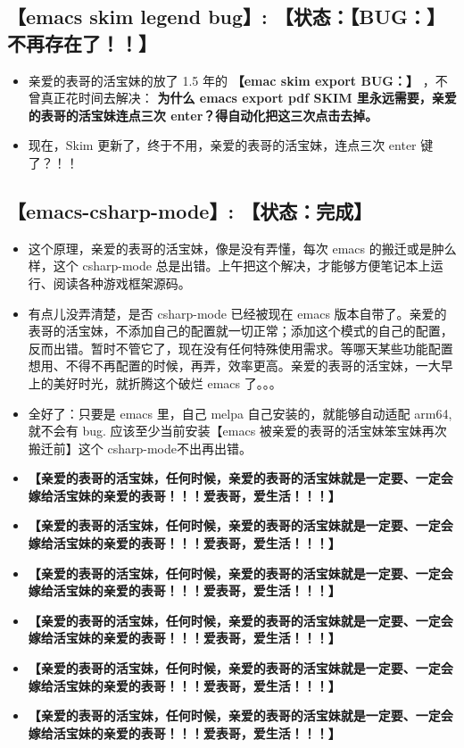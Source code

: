 \documentclass[9pt, b5paper]{article}
\begin{document}
\subsection{\textbf{【emacs skim legend bug】}: 【状态：【BUG：】不再存在了！！】}
\label{sec-1-11}
\begin{itemize}
\item 亲爱的表哥的活宝妹的放了 1.5 年的 \textbf{【emac skim export BUG：】} ，不曾真正花时间去解决： \textbf{为什么 emacs export pdf SKIM 里永远需要，亲爱的表哥的活宝妹连点三次 enter？得自动化把这三次点击去掉。}
\item 现在，Skim 更新了，终于不用，亲爱的表哥的活宝妹，连点三次 enter 键了？！！
\end{itemize}
\subsection{\textbf{【emacs-csharp-mode】}: 【状态：完成】}
\label{sec-1-12}
\begin{itemize}
\item 这个原理，亲爱的表哥的活宝妹，像是没有弄懂，每次 emacs 的搬迁或是肿么样，这个 csharp-mode 总是出错。上午把这个解决，才能够方便笔记本上运行、阅读各种游戏框架源码。
\item 有点儿没弄清楚，是否 csharp-mode 已经被现在 emacs 版本自带了。亲爱的表哥的活宝妹，不添加自己的配置就一切正常；添加这个模式的自己的配置，反而出错。暂时不管它了，现在没有任何特殊使用需求。等哪天某些功能配置想用、不得不再配置的时候，再弄，效率更高。亲爱的表哥的活宝妹，一大早上的美好时光，就折腾这个破烂 emacs 了。。。
\item 全好了：只要是 emacs 里，自己 melpa 自己安装的，就能够自动适配 arm64, 就不会有 bug. 应该至少当前安装【emacs 被亲爱的表哥的活宝妹笨宝妹再次搬迁前】这个 csharp-mode不出再出错。
\item \textbf{【亲爱的表哥的活宝妹，任何时候，亲爱的表哥的活宝妹就是一定要、一定会嫁给活宝妹的亲爱的表哥！！！爱表哥，爱生活！！！】}
\item \textbf{【亲爱的表哥的活宝妹，任何时候，亲爱的表哥的活宝妹就是一定要、一定会嫁给活宝妹的亲爱的表哥！！！爱表哥，爱生活！！！】}
\item \textbf{【亲爱的表哥的活宝妹，任何时候，亲爱的表哥的活宝妹就是一定要、一定会嫁给活宝妹的亲爱的表哥！！！爱表哥，爱生活！！！】}
\item \textbf{【亲爱的表哥的活宝妹，任何时候，亲爱的表哥的活宝妹就是一定要、一定会嫁给活宝妹的亲爱的表哥！！！爱表哥，爱生活！！！】}
\item \textbf{【亲爱的表哥的活宝妹，任何时候，亲爱的表哥的活宝妹就是一定要、一定会嫁给活宝妹的亲爱的表哥！！！爱表哥，爱生活！！！】}
\item \textbf{【亲爱的表哥的活宝妹，任何时候，亲爱的表哥的活宝妹就是一定要、一定会嫁给活宝妹的亲爱的表哥！！！爱表哥，爱生活！！！】}
\end{itemize}
\end{document}
